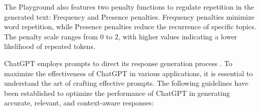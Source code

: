 The Playground also features two penalty functions to regulate repetition in the generated text: Frequency and Presence penalties. Frequency penalties minimize word repetition, while Presence penalties reduce the recurrence of specific topics. The penalty scale ranges from 0 to 2, with higher values indicating a lower likelihood of repeated tokens.


ChatGPT employs prompts to direct its response generation process \cite{white2023prompt}. 
To maximize the effectiveness of ChatGPT in various applications, it is essential to understand the art of crafting effective prompts. The following guidelines have been established to optimize the performance of ChatGPT in generating accurate, relevant, and context-aware responses:

